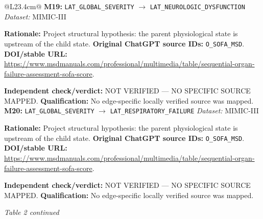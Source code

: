 \begin{tabular}{@{}L{23.4cm}@{}}
\addlinespace[2pt]
\midrule
\textbf{M19:} \nolinkurl{LAT_GLOBAL_SEVERITY} $\rightarrow$ \nolinkurl{LAT_NEUROLOGIC_DYSFUNCTION} \hfill \textit{Dataset:} MIMIC-III\par\textbf{Rationale:} Project structural hypothesis: the parent physiological state is upstream of the child state. \textbf{Original ChatGPT source IDs:} \nolinkurl{O_SOFA_MSD}. \textbf{DOI/stable URL:} \url{https://www.msdmanuals.com/professional/multimedia/table/sequential-organ-failure-assessment-sofa-score}.\par\textbf{Independent check/verdict:} NOT VERIFIED --- NO SPECIFIC SOURCE MAPPED. \textbf{Qualification:} No edge-specific locally verified source was mapped. \\
\addlinespace[2pt]
\midrule
\textbf{M20:} \nolinkurl{LAT_GLOBAL_SEVERITY} $\rightarrow$ \nolinkurl{LAT_RESPIRATORY_FAILURE} \hfill \textit{Dataset:} MIMIC-III\par\textbf{Rationale:} Project structural hypothesis: the parent physiological state is upstream of the child state. \textbf{Original ChatGPT source IDs:} \nolinkurl{O_SOFA_MSD}. \textbf{DOI/stable URL:} \url{https://www.msdmanuals.com/professional/multimedia/table/sequential-organ-failure-assessment-sofa-score}.\par\textbf{Independent check/verdict:} NOT VERIFIED --- NO SPECIFIC SOURCE MAPPED. \textbf{Qualification:} No edge-specific locally verified source was mapped. \\
\addlinespace[2pt]
\midrule
\bottomrule
\end{tabular}
\clearpage
\textit{Table 2 continued}\par
